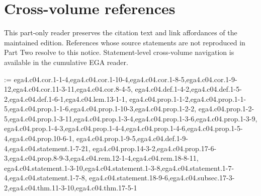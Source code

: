 \clearpage
{}
\section*{Cross-volume references}

This part-only reader preserves the citation text and link affordances of the
maintained edition. References whose source statements are not reproduced in
Part Two resolve to this notice. Statement-level cross-volume navigation is
available in the cumulative EGA reader.

\label{0.16.4.6.i}

\makeatletter
\newcommand{\EGAIVTwoRegisterExternalTargets}[1]{%
  \@for\EGAIVTwoExternalTarget:=#1\do{%
    \edef\EGAIVTwoResolvedTarget{\EGAIVTwoExternalTarget}%
    \expandafter\sgaStableTarget\expandafter{\EGAIVTwoResolvedTarget}%
  }%
}
\makeatother

\EGAIVTwoRegisterExternalTargets{%
ega4.c04.cor.1-1-4,ega4.c04.cor.1-10-4,ega4.c04.cor.1-8-5,ega4.c04.cor.1-9-12,ega4.c04.cor.11-3-11,ega4.c04.cor.8-4-5,%
ega4.c04.def.1-4-2,ega4.c04.def.1-5-2,ega4.c04.def.1-6-1,ega4.c04.lem.13-1-1,%
ega4.c04.prop.1-1-2,ega4.c04.prop.1-1-5,ega4.c04.prop.1-1-6,ega4.c04.prop.1-10-3,ega4.c04.prop.1-2-2,%
ega4.c04.prop.1-2-5,ega4.c04.prop.1-3-11,ega4.c04.prop.1-3-4,ega4.c04.prop.1-3-6,ega4.c04.prop.1-3-9,%
ega4.c04.prop.1-4-3,ega4.c04.prop.1-4-4,ega4.c04.prop.1-4-6,ega4.c04.prop.1-5-4,ega4.c04.prop.10-6-1,%
ega4.c04.prop.1-9-5,ega4.c04.def.1-9-4,ega4.c04.statement.1-7-21,%
ega4.c04.prop.14-3-2,ega4.c04.prop.17-6-3,ega4.c04.prop.8-9-3,ega4.c04.rem.12-1-4,ega4.c04.rem.18-8-11,%
ega4.c04.statement.1-3-10,ega4.c04.statement.1-3-8,ega4.c04.statement.1-7-4,ega4.c04.statement.1-7-8,%
ega4.c04.statement.18-9-6,ega4.c04.subsec.17-3-2,ega4.c04.thm.11-3-10,ega4.c04.thm.17-5-1%
}
